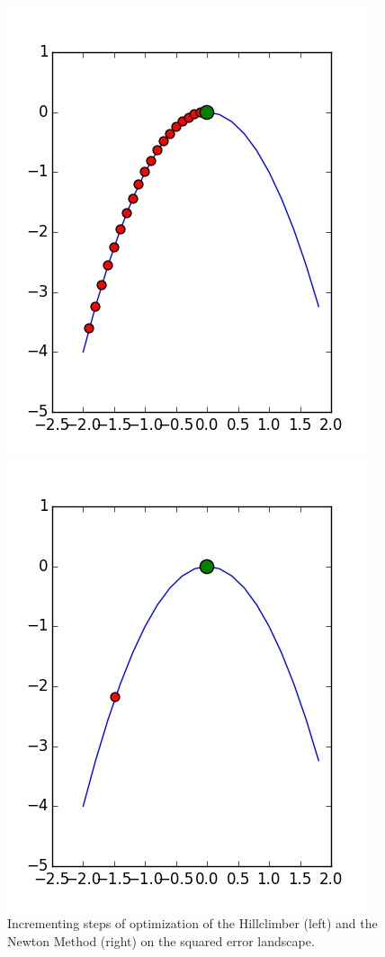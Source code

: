 \documentclass{scrartcl}
\begin{document}
\begin{figure}[H]
\centering
\begin{minipage}{.5\textwidth}
  \centering
  \includegraphics[width=.8\linewidth]{img/ex1/runs/HC-SquaredError2D_-1,9.jpg}
\end{minipage}%
\begin{minipage}{.5\textwidth}
  \centering
  \includegraphics[width=.8\linewidth]{img/ex1/runs/NM-SquaredError2D_-1,48.jpg}
\end{minipage}
\caption{Incrementing steps of optimization of the Hillclimber (left) and the Newton Method (right) on the squared error landscape.}
\label{fig:}
\end{figure}
\end{document}

